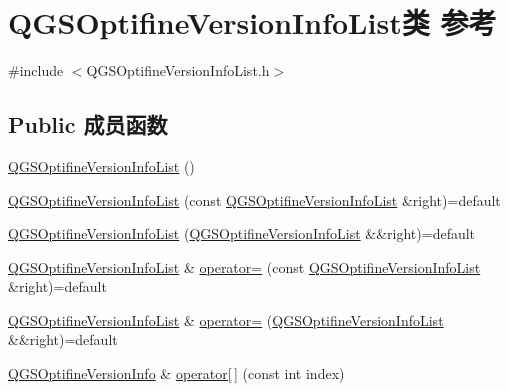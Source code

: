 \hypertarget{class_q_g_s_optifine_version_info_list}{}\section{Q\+G\+S\+Optifine\+Version\+Info\+List类 参考}
\label{class_q_g_s_optifine_version_info_list}


{\ttfamily \#include $<$Q\+G\+S\+Optifine\+Version\+Info\+List.\+h$>$}

\subsection*{Public 成员函数}
\begin{DoxyCompactItemize}
\item 
\mbox{\hyperlink{class_q_g_s_optifine_version_info_list_a24b409e8442f7584853e386b1aa0560a}{Q\+G\+S\+Optifine\+Version\+Info\+List}} ()
\item 
\mbox{\hyperlink{class_q_g_s_optifine_version_info_list_a315041bad31aae8eed980d64cf85f6ce}{Q\+G\+S\+Optifine\+Version\+Info\+List}} (const \mbox{\hyperlink{class_q_g_s_optifine_version_info_list}{Q\+G\+S\+Optifine\+Version\+Info\+List}} \&right)=default
\item 
\mbox{\hyperlink{class_q_g_s_optifine_version_info_list_a7dcfcf03f19b6d4867763864d45a38e0}{Q\+G\+S\+Optifine\+Version\+Info\+List}} (\mbox{\hyperlink{class_q_g_s_optifine_version_info_list}{Q\+G\+S\+Optifine\+Version\+Info\+List}} \&\&right)=default
\item 
\mbox{\hyperlink{class_q_g_s_optifine_version_info_list}{Q\+G\+S\+Optifine\+Version\+Info\+List}} \& \mbox{\hyperlink{class_q_g_s_optifine_version_info_list_a1da93d6914f1cd4b0c27d2b2a57923bc}{operator=}} (const \mbox{\hyperlink{class_q_g_s_optifine_version_info_list}{Q\+G\+S\+Optifine\+Version\+Info\+List}} \&right)=default
\item 
\mbox{\hyperlink{class_q_g_s_optifine_version_info_list}{Q\+G\+S\+Optifine\+Version\+Info\+List}} \& \mbox{\hyperlink{class_q_g_s_optifine_version_info_list_a93d776ac4dbc2426c1d1b32f707fc761}{operator=}} (\mbox{\hyperlink{class_q_g_s_optifine_version_info_list}{Q\+G\+S\+Optifine\+Version\+Info\+List}} \&\&right)=default
\item 
\mbox{\hyperlink{class_q_g_s_optifine_version_info}{Q\+G\+S\+Optifine\+Version\+Info}} \& \mbox{\hyperlink{class_q_g_s_optifine_version_info_list_a50a1888c4d3d88588c248466a40e43c8}{operator\mbox{[}$\,$\mbox{]}}} (const int index)

\end{DoxyCompactItemize}
